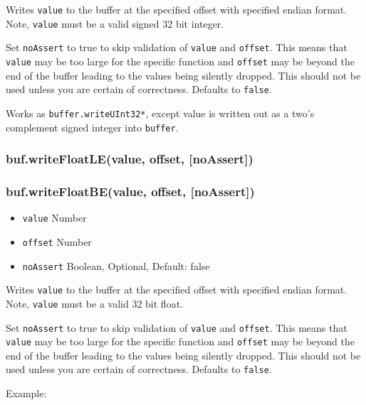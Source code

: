 Writes \texttt{value} to the buffer at the specified offset with
specified endian format. Note, \texttt{value} must be a valid signed 32
bit integer.

Set \texttt{noAssert} to true to skip validation of \texttt{value} and
\texttt{offset}. This means that \texttt{value} may be too large for the
specific function and \texttt{offset} may be beyond the end of the
buffer leading to the values being silently dropped. This should not be
used unless you are certain of correctness. Defaults to \texttt{false}.

Works as \texttt{buffer.writeUInt32*}, except value is written out as a
two's complement signed integer into \texttt{buffer}.

\subsubsection{buf.writeFloatLE(value, offset, {[}noAssert{]})}

\subsubsection{buf.writeFloatBE(value, offset, {[}noAssert{]})}

\begin{itemize}
\item
  \texttt{value} Number
\item
  \texttt{offset} Number
\item
  \texttt{noAssert} Boolean, Optional, Default: false
\end{itemize}

Writes \texttt{value} to the buffer at the specified offset with
specified endian format. Note, \texttt{value} must be a valid 32 bit
float.

Set \texttt{noAssert} to true to skip validation of \texttt{value} and
\texttt{offset}. This means that \texttt{value} may be too large for the
specific function and \texttt{offset} may be beyond the end of the
buffer leading to the values being silently dropped. This should not be
used unless you are certain of correctness. Defaults to \texttt{false}.

Example:

\begin{Shaded}
\begin{Highlighting}[]
  \NormalTok{);}
\NormalTok{(}\NormalTok{, }\NormalTok{);}


\NormalTok{(}\NormalTok{, }\NormalTok{);}


\end{Highlighting}
\end{Shaded}

